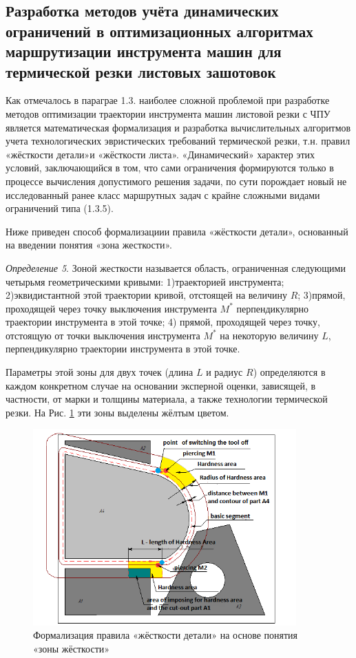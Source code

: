 \documentclass{article}
\begin{document}
\subsection{Разработка методов учёта динамических ограничений
  в оптимизационных алгоритмах маршрутизации инструмента машин для термической резки листовых зашотовок}

Как отмечалось в параграе 1.3.
наиболее сложной проблемой при разработке методов оптимизации
траектории инструмента машин листовой резки с ЧПУ
является математическая формализация и
разработка вычислительных алгоритмов учета
технологических эвристических требований термической резки,
т.н. правил «жёсткости детали»и «жёсткости листа».
«Динамический» характер этих условий, заключающийся в том,
что сами ограничения формируются только в процессе вычисления
допустимого решения задачи, по сути порождает
новый не исследованный ранее класс маршрутных задач
с крайне сложными видами ограничений типа (1.3.5).

Ниже приведен способ формализациии правила «жёсткости детали»,
основанный на введении понятия «зона жесткости».

{\it Определение 5}.
Зоной жесткости называется область,
ограниченная следующими четырьмя геометрическими кривыми:
1)траекторией инструмента;
2)эквидистантной этой траектории кривой, отстоящей на величину $R$;
3)прямой, проходящей через точку выключения инструмента $M^*$
перпендикулярно траектории инструмента в этой точке;
4) прямой, проходящей через точку,
отстоящую от точки выключения инструмента $M^*$ на некоторую величину $L$,
перпендикулярно траектории инструмента в этой точке.

Параметры этой зоны для двух точек
(длина $L$ и радиус $R$)
определяются в каждом конкретном случае
на основании эксперной оценки,
зависящей, в частности, от марки и толщины материала,
а также технологии термической резки.
На Рис. \ref{hardness-area}
эти зоны выделены жёлтым цветом.

\begin{figure}
  \begin{center}
  \includegraphics[width=0.9\textwidth]{hardness-area.png}
  \caption{Формализация правила «жёсткости детали» на основе понятия «зоны жёсткости»}
  \label{hardness-area}
  \end{center}
\end{figure}
\end{document}
